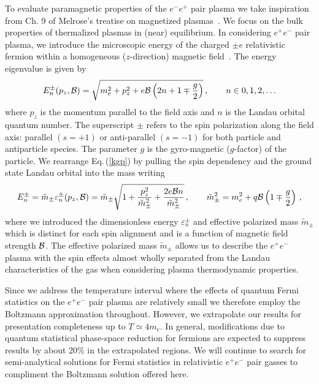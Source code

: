 \documentclass[a4paper]{article}
\newcommand{\req}[1]{Eq.\,(\ref{#1})}
\newcommand*{\xblue}{\color{black}}
\begin{document}
To evaluate paramagnetic properties of the $e^-e^+$ pair plasma we take inspiration from Ch. 9 of Melrose's treatise on magnetized plasmas~\cite{melrose2008quantum}. We focus  on the bulk properties of thermalized plasmas in (near) equilibrium. In considering $e^{+}e^{-}$ pair plasma, we introduce the microscopic energy of the charged $\pm e$ relativistic fermion within a homogeneous ($z$-direction) magnetic field~\cite{steinmetz2018magnetic}. The energy eigenvalue is given by
\begin{align}
    \label{kgp}
    E^{\pm}_{n}(p_{z},{\cal B})=\sqrt{m_{e}^{2}+p_{z}^{2}+e{\cal B}\left(2n+1\mp\frac{g}{2}\right)}\,,\qquad n\in0,1,2,\ldots
\end{align}
where $p_{z}$ is the momentum parallel to the field axis and $n$ is the Landau orbital quantum number. The {\xblue superscript} $\pm$ refers to the spin polarization along the field axis: parallel $(s=+1)$ or anti-parallel $(s=-1)$ {\xblue for both particle and antiparticle species.} The parameter $g$ is the gyro-magnetic ($g$-factor) of the particle. We rearrange \req{kgp} by pulling the spin dependency and the ground state Landau orbital into the mass writing
\begin{align}
    \label{effmass}
    E^{\pm}_{n}={\tilde m}_{\pm}\varepsilon_{n}^{\pm}(p_{z},{\cal B})={\tilde m}_{\pm}\sqrt{1+\frac{p_{z}^{2}}{{\tilde m}_{\pm}^{2}}+\frac{2e{\cal B}n}{{\tilde m}_{\pm}^{2}}}\,,\qquad {\tilde m}_{\pm}^{2}=m_{e}^{2}+q{\cal B}\left(1\mp\frac{g}{2}\right)\,,
\end{align}
where we introduced the {\xblue dimensionless energy $\varepsilon^{\pm}_{n}$ and} effective polarized mass ${\tilde m}_{\pm}$ which is distinct for each spin alignment and is a function of magnetic field strength ${\cal B}$. The effective polarized mass ${\tilde m}_{\pm}$ allows us to describe the $e^{+}e^{-}$ plasma with the spin effects almost wholly separated from the Landau characteristics of the gas when considering plasma thermodynamic properties.

Since {\xblue we address} the temperature interval where {\xblue the effects of quantum Fermi statistics on the $e^{+}e^{-}$ pair plasma} are relatively small we therefore employ the Boltzmann approximation throughout. However, we extrapolate our results for presentation completeness up to $T\simeq 4m_{e}$. In general, modifications due to quantum statistical phase-space reduction for fermions are expected to {\xblue suppress results} by about 20\% {\xblue in the extrapolated regions}. We will continue to search for semi-analytical solutions for Fermi statistics in relativistic $e^{+}e^{-}$ pair gasses {\xblue to compliment the} Boltzmann solution offered here. 
\end{document}
